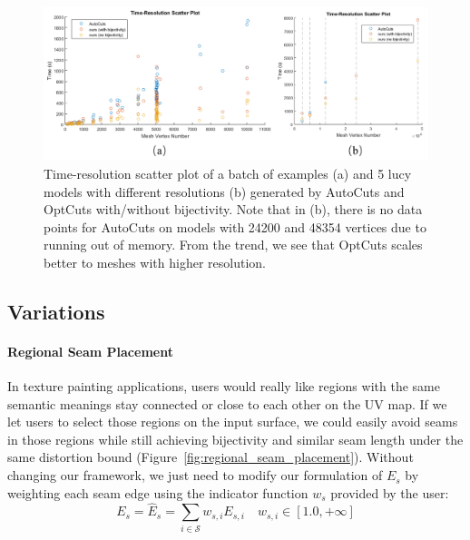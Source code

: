 \begin{figure}[!h]
\centering
\includegraphics[width=\linewidth]{fig/time_res_compAutoCuts.png}
\caption{Time-resolution scatter plot of a batch of examples (a) and 5 lucy models with different resolutions (b) generated by AutoCuts and OptCuts with/without bijectivity. Note that in (b), there is no data points for AutoCuts on models with 24200 and 48354 vertices due to running out of memory. From the trend, we see that OptCuts scales better to meshes with higher resolution.}
\label{fig:time_res_compAutoCuts}
\end{figure}


\subsection{Variations}

\paragraph{Regional Seam Placement}
In texture painting applications, users would really like regions with the same semantic meanings stay connected or close to each other on the UV map. If we let users to select those regions on the input surface, we could easily avoid seams in those regions while still achieving bijectivity and similar seam length under the same distortion bound (Figure~\ref{fig:regional_seam_placement}). Without changing our framework, we just need to modify our formulation of $E_s$ by weighting each seam edge using the indicator function $w_{s}$ provided by the user:
\[ E_s = \hat{E}_{s} = \sum_{i\in\mathcal{S}} w_{s,i} E_{s,i} \quad w_{s,i} \in [1.0, +\infty] \]

